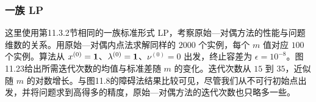 \subsubsection*{一族 LP}
这里使用第11.3.2节相同的一族标准形式 LP，考察原始—对偶方法的性能与问题维数的关系。用原始—对偶内点法求解同样的 $2000$ 个实例，每个 $m$ 值对应 $100$ 个实例。算法从 $x^{(0)}=\mathbf 1$、$\lambda^{(0)}=\mathbf 1$、$\nu^{(0)}=0$ 出发，终止容差为 $\epsilon=10^{-8}$。图11.23给出所需迭代次数的均值与标准差随 $m$ 的变化。迭代次数从 $15$ 到 $35$，近似随 $m$ 的对数增长。与图11.8的障碍法结果比较可见，尽管我们从不可行初始点出发，并将问题求到高得多的精度，原始—对偶方法的迭代次数也只略多一些。
